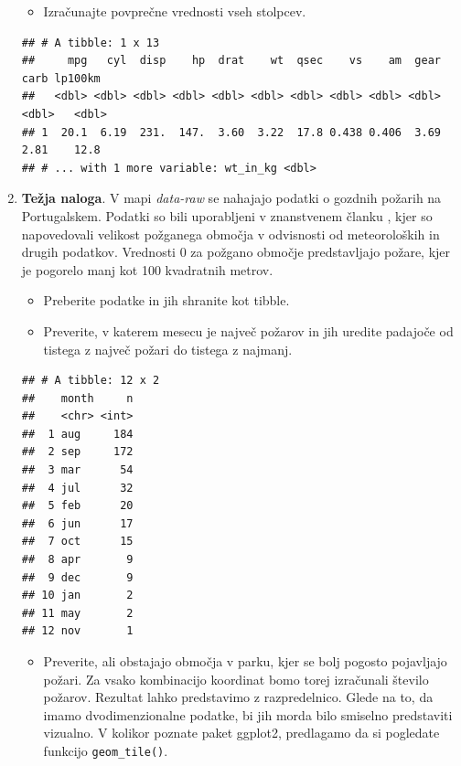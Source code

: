 \documentclass[
]{book}
\providecommand{\tightlist}{%
  \setlength{\itemsep}{0pt}\setlength{\parskip}{0pt}}
\begin{document}
\begin{enumerate}
  \begin{itemize}
  \tightlist
  \item
    Izračunajte povprečne vrednosti vseh stolpcev.
  \end{itemize}

\begin{verbatim}
## # A tibble: 1 x 13
##     mpg   cyl  disp    hp  drat    wt  qsec    vs    am  gear  carb lp100km
##   <dbl> <dbl> <dbl> <dbl> <dbl> <dbl> <dbl> <dbl> <dbl> <dbl> <dbl>   <dbl>
## 1  20.1  6.19  231.  147.  3.60  3.22  17.8 0.438 0.406  3.69  2.81    12.8
## # ... with 1 more variable: wt_in_kg <dbl>
\end{verbatim}
\item
  \textbf{Težja naloga}. V mapi \emph{data-raw} se nahajajo podatki o gozdnih požarih na Portugalskem. Podatki so bili uporabljeni v znanstvenem članku \citep{Cortez2007}, kjer so napovedovali velikost požganega območja v odvisnosti od meteoroloških in drugih podatkov. Vrednosti 0 za požgano območje predstavljajo požare, kjer je pogorelo manj kot 100 kvadratnih metrov.

  \begin{itemize}
  \tightlist
  \item
    Preberite podatke in jih shranite kot tibble.
  \item
    Preverite, v katerem mesecu je največ požarov in jih uredite padajoče od tistega z največ požari do tistega z najmanj.
  \end{itemize}

\begin{verbatim}
## # A tibble: 12 x 2
##    month     n
##    <chr> <int>
##  1 aug     184
##  2 sep     172
##  3 mar      54
##  4 jul      32
##  5 feb      20
##  6 jun      17
##  7 oct      15
##  8 apr       9
##  9 dec       9
## 10 jan       2
## 11 may       2
## 12 nov       1
\end{verbatim}

  \begin{itemize}
  \tightlist
  \item
    Preverite, ali obstajajo območja v parku, kjer se bolj pogosto pojavljajo požari. Za vsako kombinacijo koordinat bomo torej izračunali število požarov. Rezultat lahko predstavimo z razpredelnico. Glede na to, da imamo dvodimenzionalne podatke, bi jih morda bilo smiselno predstaviti vizualno. V kolikor poznate paket ggplot2, predlagamo da si pogledate funkcijo \texttt{geom\_tile()}.
  \end{itemize}


\end{enumerate}
\end{document}
